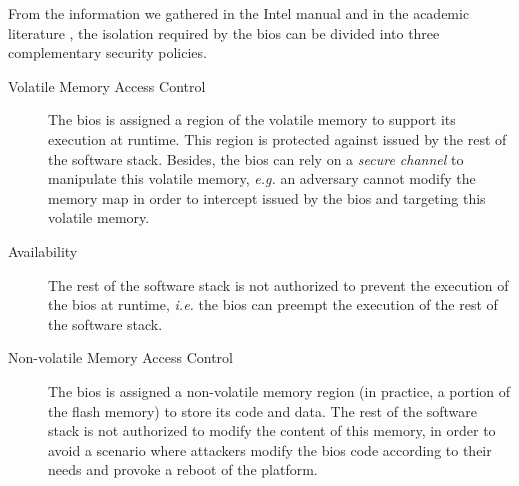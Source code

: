 %
From the information we gathered in the Intel manual and in the
academic literature , the isolation required by the \ac{bios} can be
divided into three complementary security policies.

\begin{description}
\item [Volatile Memory Access Control]
  The \ac{bios} is assigned a region of the volatile memory  to support its execution at
  runtime. This region is protected against \IOs issued by the rest of the software
  stack.
  Besides, the \ac{bios} can rely on a \emph{secure channel}   to
  manipulate this volatile memory, \emph{e.g.} an adversary cannot modify the
  memory map in order to intercept \IOs issued by the \ac{bios} and targeting
  this volatile memory.
\item [Availability]
  The rest of the software stack is not authorized to prevent the execution of
  the \ac{bios} at runtime, \emph{i.e.} the \ac{bios} can preempt the execution
  of the rest of the software stack.
\item [Non-volatile Memory Access Control]
  The \ac{bios} is assigned a non-volatile memory region (in practice, a portion
  of the flash memory) to store its code and data.
  The rest of the software stack is not authorized to modify the content of this
  memory, in order to avoid a scenario where attackers modify the \ac{bios} code
  according to their needs and provoke a reboot of the platform.
\end{description}

